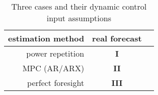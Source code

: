 \begin{table}\centering
	\begin{tabular}{r | c c}
		estimation method & real forecast\\%
		\hline
		power repetition & \textbf{I}\\%
		MPC (AR/ARX) & \textbf{II}\\%
		perfect foresight & \textbf{III}\\%
	\end{tabular}
	\caption{Three cases and their dynamic control input assumptions}
	\label{ch2:tab:cases}	
\end{table}